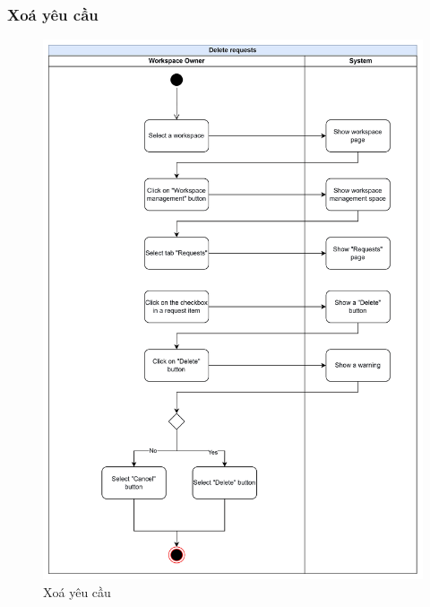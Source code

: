 \subsubsection{Xoá yêu cầu}
    \begin{figure}[H]
        \centering
        \includegraphics[width=\linewidth]{Content/Phân tích và thiết kế hệ thống/documents/Sơ đồ hoạt động/images/deleteRequests.png}
        \vspace{0.5cm}
        \caption{Xoá yêu cầu}
        \label{fig:Xoá yêu cầu}
    \end{figure}